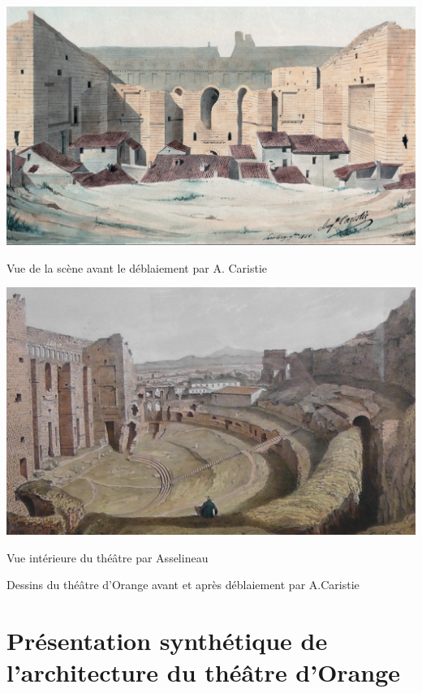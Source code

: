 		
\begin{figureth}
	\begin{subfigureth}{0.49\textwidth}
		\includegraphics[width=\linewidth]{images/av_deblaiement}
		\caption{Vue de la scène avant le déblaiement par A. Caristie \footnotemark}
		\label{av_deblaiement}
	\end{subfigureth}
	\begin{subfigureth}{0.47\textwidth}
		\includegraphics[width=\linewidth]{images/asselineau}
		\caption{Vue intérieure du théâtre par Asselineau \footnotemark}
	\end{subfigureth}
	\caption[Théâtre d'Orange avant restauration]{Dessins du théâtre d'Orange avant et après déblaiement par A.Caristie}		
\end{figureth}		
\addtocounter{footnote}{-1}
\addtocounter{footnote}{1}
		
	\chapter{Présentation synthétique de l'architecture du théâtre d'Orange}
		\minitoc
		\newpage
		
